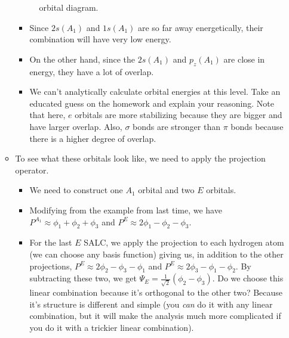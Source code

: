 \documentclass[../notes.tex]{subfiles}
\begin{document}
\begin{itemize}
\begin{itemize}
\begin{figure}[H]
            \caption{ orbital diagram.}
            \label{fig:orbitalDiagram-NH3}
        \end{figure}
        \begin{itemize}
            \item Since $2s(A_1)$ and $1s(A_1)$ are so far away energetically, their combination will have very low energy.
            \item On the other hand, since the $2s(A_1)$ and $p_z(A_1)$ are close in energy, they have a lot of overlap.
            \item We can't analytically calculate orbital energies at this level. Take an educated guess on the homework and explain your reasoning. Note that here, $e$ orbitals are more stabilizing because they are bigger and have larger overlap. Also, $\sigma$ bonds are stronger than $\pi$ bonds because there is a higher degree of overlap.
        \end{itemize}
        \item To see what these orbitals look like, we need to apply the projection operator.
        \begin{itemize}
            \item We need to construct one $A_1$ orbital and two $E$ orbitals.
            \item Modifying from the example from last time, we have $P^{A_1}\approx\phi_1+\phi_2+\phi_3$ and $P^E\approx 2\phi_1-\phi_2-\phi_3$.
            \item For the last $E$ SALC, we apply the projection to each hydrogen atom (we can choose any basis function) giving us, in addition to the other projections, $P^E\approx 2\phi_2-\phi_3-\phi_1$ and $P^E\approx 2\phi_3-\phi_1-\phi_2$. By subtracting these two, we get $\Psi_E=\frac{1}{\sqrt{2}}(\phi_2-\phi_3)$. Do we choose this linear combination because it's orthogonal to the other two? Because it's structure is different and simple (you \emph{can} do it with any linear combination, but it will make the analysis much more complicated if you do it with a trickier linear combination).

\end{itemize}
\end{itemize}
\end{itemize}
\end{document}
